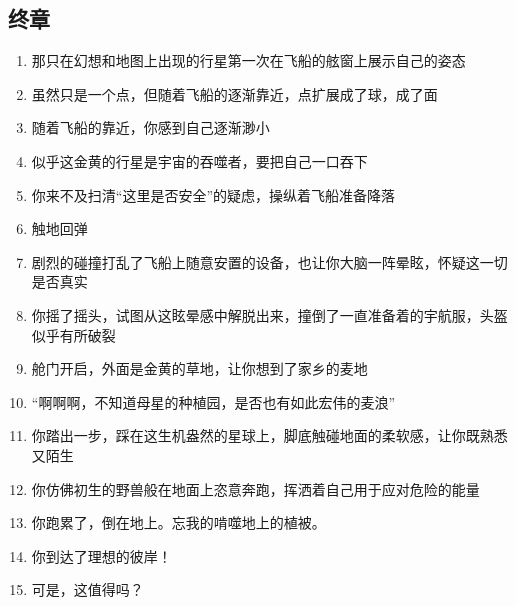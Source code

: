 \documentclass{ctexart}
\begin{document}
		\subsection{终章}
			\begin{enumerate}
				\item 那只在幻想和地图上出现的行星第一次在飞船的舷窗上展示自己的姿态
				\item 虽然只是一个点，但随着飞船的逐渐靠近，点扩展成了球，成了面
				\item 随着飞船的靠近，你感到自己逐渐渺小
				\item 似乎这金黄的行星是宇宙的吞噬者，要把自己一口吞下
				\item 你来不及扫清“这里是否安全”的疑虑，操纵着飞船准备降落
				\item 触地回弹
				\item 剧烈的碰撞打乱了飞船上随意安置的设备，也让你大脑一阵晕眩，怀疑这一切是否真实
				\item 你摇了摇头，试图从这眩晕感中解脱出来，撞倒了一直准备着的宇航服，头盔似乎有所破裂
				\item 舱门开启，外面是金黄的草地，让你想到了家乡的麦地
				\item “啊啊啊，不知道母星的种植园，是否也有如此宏伟的麦浪”
				\item 你踏出一步，踩在这生机盎然的星球上，脚底触碰地面的柔软感，让你既熟悉又陌生
				\item 你仿佛初生的野兽般在地面上恣意奔跑，挥洒着自己用于应对危险的能量
				\item 你跑累了，倒在地上。忘我的啃噬地上的植被。
				\item 你到达了理想的彼岸！
				\item 可是，这值得吗？
			\end{enumerate}
\end{document}
